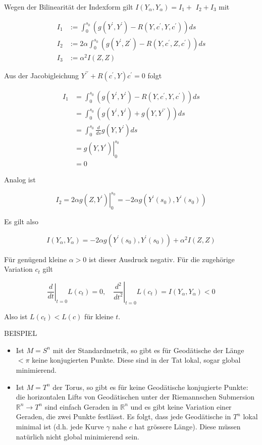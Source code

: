 \documentclass[10pt, letterpaper]{article}
\begin{document}
Wegen der Bilinearität der Indexform gilt $I\left(Y_{\alpha}, Y_{\alpha}\right)=I_{1}+$ $I_{2}+I_{3}$ mit

$$
\begin{aligned}
I_{1} & :=\int_{0}^{s_{0}}\left(g\left(Y^{\prime}, Y^{\prime}\right)-R\left(Y, c^{\prime}, Y, c^{\prime}\right)\right) d s \\
I_{2} & :=2 \alpha \int_{0}^{s_{0}}\left(g\left(Y^{\prime}, Z^{\prime}\right)-R\left(Y, c^{\prime}, Z, c^{\prime}\right)\right) d s \\
I_{3} & :=\alpha^{2} I(Z, Z)
\end{aligned}
$$

Aus der Jacobigleichung $Y^{\prime \prime}+R\left(c^{\prime}, Y\right) c^{\prime}=0$ folgt

$$
\begin{aligned}
I_{1} & =\int_{0}^{s_{0}}\left(g\left(Y^{\prime}, Y^{\prime}\right)-R\left(Y, c^{\prime}, Y, c^{\prime}\right)\right) d s \\
& =\int_{0}^{s_{0}}\left(g\left(Y^{\prime}, Y^{\prime}\right)+g\left(Y, Y^{\prime \prime}\right)\right) d s \\
& =\int_{0}^{s_{0}} \frac{d}{d s} g\left(Y, Y^{\prime}\right) d s \\
& =\left.g\left(Y, Y^{\prime}\right)\right|_{0} ^{s_{0}} \\
& =0
\end{aligned}
$$

Analog ist

$$
I_{2}=\left.2 \alpha g\left(Z, Y^{\prime}\right)\right|_{0} ^{s_{0}}=-2 \alpha g\left(Y^{\prime}\left(s_{0}\right), Y^{\prime}\left(s_{0}\right)\right)
$$

Es gilt also

$$
I\left(Y_{\alpha}, Y_{\alpha}\right)=-2 \alpha g\left(Y^{\prime}\left(s_{0}\right), Y^{\prime}\left(s_{0}\right)\right)+\alpha^{2} I(Z, Z)
$$

Für genügend kleine $\alpha>0$ ist dieser Ausdruck negativ. Für die zugehörige Variation $c_{t}$ gilt

$$
\left.\frac{d}{d t}\right|_{t=0} L\left(c_{t}\right)=0,\left.\quad \frac{d^{2}}{d t^{2}}\right|_{t=0} L\left(c_{t}\right)=I\left(Y_{\alpha}, Y_{\alpha}\right)<0
$$

Also ist $L\left(c_{t}\right)<L(c)$ für kleine $t$.

BEISPIEL

\begin{itemize}
  \item Ist $M=S^{n}$ mit der Standardmetrik, so gibt es für Geodätische der Länge $<\pi$ keine konjugierten Punkte. Diese sind in der Tat lokal, sogar global minimierend.
  \item Ist $M=T^{n}$ der Torus, so gibt es für keine Geodätische konjugierte Punkte: die horizontalen Lifts von Geodätischen unter der Riemannschen Submersion $\mathbb{R}^{n} \rightarrow T^{n}$ sind einfach Geraden in $\mathbb{R}^{n}$ und es gibt keine Variation einer Geraden, die zwei Punkte festlässt. Es folgt, dass jede Geodätische in $T^{n}$ lokal minimal ist (d.h. jede Kurve $\gamma$ nahe $c$ hat grössere Länge). Diese müssen natürlich nicht global minimierend sein.
\end{itemize}
\end{document}
